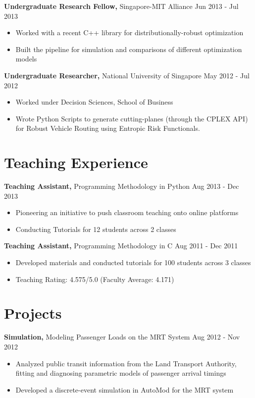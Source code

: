 \documentclass[margin]{res}
\begin{document}
\begin{resume}
{\bf Undergraduate Research Fellow,} Singapore-MIT Alliance \hfill Jun 2013 - Jul 2013
\begin{itemize} \itemsep -2pt %
\item Worked with a recent C++ library for distributionally-robust optimization
\item Built the pipeline for simulation and comparisons of different optimization models
\end{itemize}

{\bf Undergraduate Researcher,} National University of Singapore \hfill May 2012 - Jul 2012
\begin{itemize} \itemsep -2pt
\item Worked under Decision Sciences, School of Business
\item Wrote Python Scripts to generate cutting-planes (through the CPLEX API) for Robust Vehicle Routing using Entropic Risk Functionals.

\end{itemize}

\section{Teaching Experience}
{\bf Teaching Assistant,} Programming Methodology in Python \hfill Aug 2013 - Dec 2013
\begin{itemize} \itemsep -2pt
\item Pioneering an initiative to push classroom teaching onto online platforms
\item Conducting Tutorials for 12 students across 2 classes
\end{itemize}

{\bf Teaching Assistant,} Programming Methodology in C \hfill Aug 2011 - Dec 2011
\begin{itemize} \itemsep -2pt
\item Developed materials and conducted tutorials for 100 students across 3 classes
\item Teaching Rating: 4.575/5.0 (Faculty Average: 4.171)
\end{itemize}

\section{Projects}
{\bf Simulation,} Modeling Passenger Loads on the MRT System \hfill Aug 2012 - Nov 2012
\begin{itemize} \itemsep -2pt
\item Analyzed public transit information from the Land Transport Authority, fitting and diagnosing parametric models of passenger arrival timings
\item Developed a discrete-event simulation in AutoMod for the MRT system
\end{itemize}


\end{resume}
\end{document}
